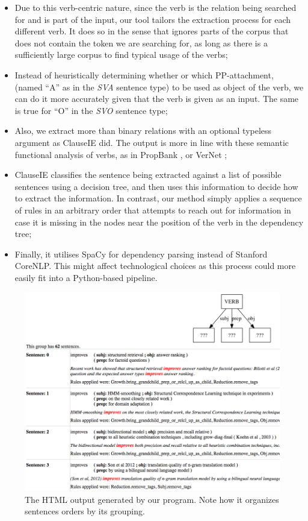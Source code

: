 \documentclass[11pt,a4paper,openright]{memoir}
\begin{document}
\begin{itemize}
	\item Due to this verb-centric nature, since the verb is the relation being searched for and is part of the input, our tool tailors the extraction process for each different verb. It does so in the sense that ignores parts of the corpus that does not contain the token we are searching for, as long as there is a sufficiently large corpus to find typical usage of the verbs;
	\item Instead of heuristically determining whether or which PP-attachment, (named \enquote{A} as in the \emph{SVA} sentence type) to be used as object of the verb, we can do it more accurately given that the verb is given as an input. The same is true for \enquote{O} in the \emph{SVO} sentence type;
	\item Also, we extract more than binary relations with an optional typeless argument as ClauseIE did. The output is more in line with these semantic functional analysis of verbs, as in PropBank \cite{Palmer:2005:PBA:1122624.1122628}, or VerNet \cite{Schuler:2005:VBC:1104493};
	\item ClauseIE classifies the sentence being extracted against a list of possible sentences using a decision tree, and then uses this information to decide how to extract the information. In contrast, our method simply applies a sequence of rules in an arbitrary order that attempts to reach out for information in case it is missing in the nodes near the position of the verb in the dependency tree;
	\item Finally, it utilises SpaCy for dependency parsing instead of Stanford CoreNLP. This might affect technological choices as this process could more easily fit into a Python-based pipeline.
\end{itemize}

\begin{figure}[!htbp]
  \centering
    \includegraphics[width=1.0\textwidth]{./images/html_output}
  \caption[The HTML output generated by our program.]{The HTML output generated by our program. Note how it organizes sentences orders by its grouping.}
  \label{fig:html_output}
\end{figure}
\end{document}
